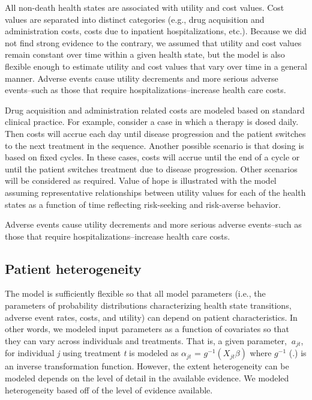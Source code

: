 \documentclass[11pt,final,fleqn]{article}\usepackage[]{graphicx}\usepackage[]{color}
\theoremstyle{plain}
\begin{document}
{All non-death health states are associated with utility and cost values. Cost values are separated into distinct categories (e.g., drug acquisition and administration costs, costs due to inpatient hospitalizations, etc.). Because we did not find strong evidence to the contrary, we assumed that utility and cost values remain constant over time within a given health state, but the model is also flexible enough to estimate utility and cost values that vary over time in a general manner. Adverse events cause utility decrements and more serious adverse events--such as those that require hospitalizations--increase health care costs. 

Drug acquisition and administration related costs are modeled based on standard clinical practice. For example, consider a case in which a therapy is dosed daily. Then costs will accrue each day until disease progression and the patient switches to the next treatment in the sequence. Another possible scenario is that dosing is based on fixed cycles. In these cases, costs will accrue until the end of a cycle or until the patient switches treatment due to disease progression. Other scenarios will be considered as required. 
Value of hope is illustrated with the model assuming representative relationships between utility values for each of the health states as a function of time reflecting risk-seeking and risk-averse behavior. 

Adverse events cause utility decrements and more serious adverse events--such as those that require hospitalizations--increase health care costs. 

\subsection{Patient heterogeneity}
The model is sufficiently flexible so that all model parameters (i.e., the parameters of probability distributions characterizing health state transitions, adverse event rates, costs, and utility) can depend on patient characteristics. In other words, we modeled input parameters as a function of covariates so that they can vary across individuals and treatments. That is, a given parameter, $\ a_{jt} $, for individual \textit{j} using treatment \textit{t} is modeled as $ \alpha_{jt} $ = $ \textit{g}^{-1} (X_{jt}\beta) $ where $ \textit{g}^{-1} $ (.) is an inverse transformation function. However, the extent heterogeneity can be modeled depends on the level of detail in the available evidence. We modeled heterogeneity based off of the level of evidence available. 

}
\end{document}
